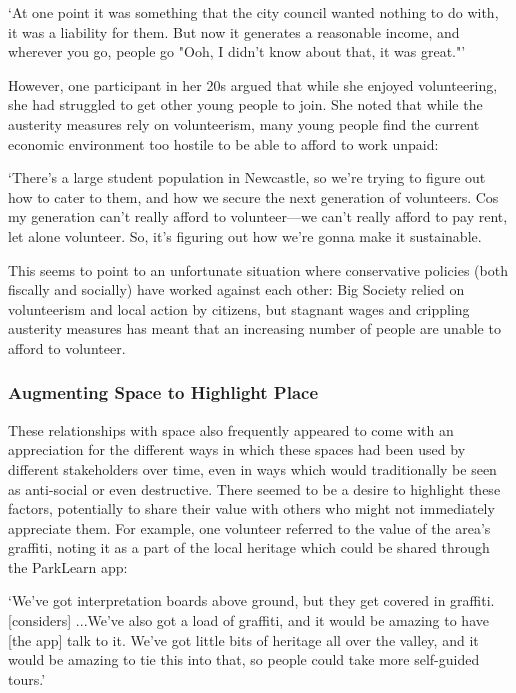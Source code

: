 \begin{displayquote}
`At one point it was something that the city council wanted nothing to do with, it was a liability for them. But now it generates a reasonable income, and wherever you go, people go "Ooh, I didn't know about that, it was great."' 
\end{displayquote}

However, one participant in her 20s argued that while she enjoyed volunteering, she had struggled to get other young people to join. She noted that while the austerity measures rely on volunteerism, many young people find the current economic environment too hostile to be able to afford to work unpaid: 

\begin{displayquote}
`There's a large student population in Newcastle, so we're trying to figure out how to cater to them, and how we secure the next generation of volunteers. Cos my generation can't really afford to volunteer---we can't really afford to pay rent, let alone volunteer. So, it's figuring out how we're gonna make it sustainable.
\end{displayquote}

This seems to point to an unfortunate situation where conservative policies (both fiscally and socially) have worked against each other: Big Society relied on volunteerism and local action by citizens, but stagnant wages and crippling austerity measures has meant that an increasing number of people are unable to afford to volunteer.

\subsubsection{Augmenting Space to Highlight Place}

These relationships with space also frequently appeared to come with an appreciation for the different ways in which these spaces had been used by different stakeholders over time, even in ways which would traditionally be seen as anti-social or even destructive. There seemed to be a desire to highlight these factors, potentially to share their value with others who might not immediately appreciate them. For example, one volunteer referred to the value of the area's graffiti, noting it as a part of the local heritage which could be shared through the ParkLearn app:

\begin{displayquote}
`We've got interpretation boards above ground, but they get covered in graffiti. [considers] ...We've also got a load of graffiti, and it would be amazing to have [the app] talk to it. We've got little bits of heritage all over the valley, and it would be amazing to tie this into that, so people could take more self-guided tours.'
\end{displayquote}

